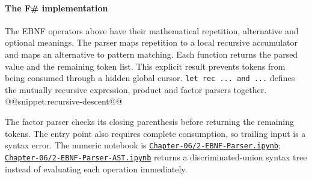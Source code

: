 \paragraph{The F\# implementation} The EBNF operators above have their mathematical repetition, alternative and optional meanings.
The parser maps repetition to a local recursive accumulator and maps an alternative to pattern matching.
Each function returns the parsed value and the remaining token list.
This explicit result prevents tokens from being consumed through a hidden global cursor.
\texttt{let rec ... and ...} defines the mutually recursive expression, product and factor parsers together.
@@snippet:recursive-descent@@

The factor parser checks its closing parenthesis before returning the remaining tokens.
The entry point also requires complete consumption, so trailing input is a syntax error.
The numeric notebook is \href{../../Chapter-06/2-EBNF-Parser.ipynb}{\nolinkurl{Chapter-06/2-EBNF-Parser.ipynb}}; \href{../../Chapter-06/2-EBNF-Parser-AST.ipynb}{\nolinkurl{Chapter-06/2-EBNF-Parser-AST.ipynb}} returns a discriminated-union syntax tree instead of evaluating each operation immediately.
\label{fig:differentiate.stlx}
